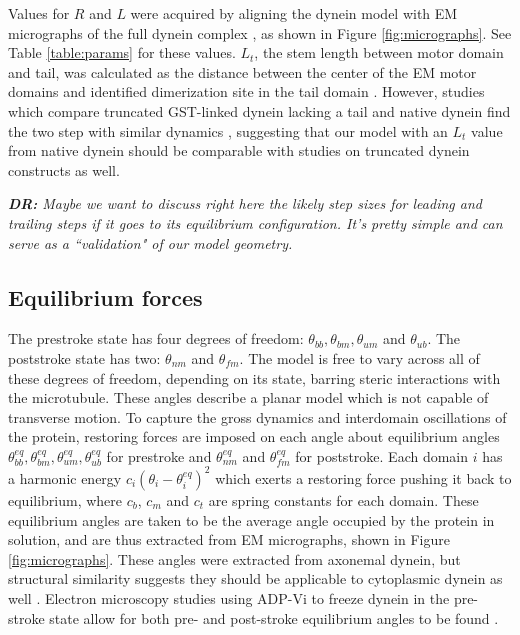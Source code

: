 \documentclass[9pt,twocolumn,twoside]{article}
\newcommand\davidsays[1]{{\em\color{blue} {\bf DR:} #1}}
\begin{document}
Values for $R$ and $L$ were acquired by aligning the dynein model with EM micrographs of the full dynein complex \cite{burgess-paper,grotjahn}, as shown in Figure \ref{fig:micrographs}. See Table \ref{table:params} for these values. $L_t$, the stem length between motor domain and tail, was calculated as the distance between the center of the EM motor domains and identified dimerization site in the tail domain \cite{}. However, studies which compare truncated GST-linked dynein lacking a tail and native dynein find the two step with similar dynamics \cite{weihongpaper-i-think}, suggesting that our model with an $L_t$ value from native dynein should be comparable with studies on truncated dynein constructs as well.

\davidsays{Maybe we want to discuss right here the likely step sizes for leading and trailing steps \emph{if it goes to its equilibrium configuration}.  It's pretty simple and can serve as a ``validation" of our model geometry.}


\subsection*{Equilibrium forces}
The prestroke state has four degrees of freedom: $\theta_{bb}, \theta_{bm}, \theta_{um}$ and $\theta_{ub}$. The poststroke state has two: $\theta_{nm}$ and $\theta_{fm}$. The model is free to vary across all of these degrees of freedom, depending on its state, barring steric interactions with the microtubule. These angles describe a planar model which is not capable of transverse motion. To capture the gross dynamics and interdomain oscillations of the protein, restoring forces are imposed on each angle about equilibrium angles $\theta^{eq}_{bb}, \theta^{eq}_{bm}, \theta^{eq}_{um}, \theta^{eq}_{ub}$ for prestroke and $\theta^{eq}_{nm}$ and $\theta^{eq}_{fm}$ for poststroke. Each domain $i$ has a harmonic energy $c_i\left(\theta_i-\theta^{eq}_i\right)^2$ which exerts a restoring force pushing it back to equilibrium, where $c_b$, $c_m$ and $c_t$ are spring constants for each domain. These equilibrium angles are taken to be the average angle occupied by the protein in solution, and are thus extracted from EM micrographs, shown in Figure \ref{fig:micrographs}. These angles were extracted from axonemal dynein, but structural similarity suggests they should be applicable to cytoplasmic dynein as well \cite{dynein-c-paper}. Electron microscopy studies using ADP-Vi to freeze dynein in the pre-stroke state allow for both pre- and post-stroke equilibrium angles to be found \cite{burgess-paper}.
\end{document}
